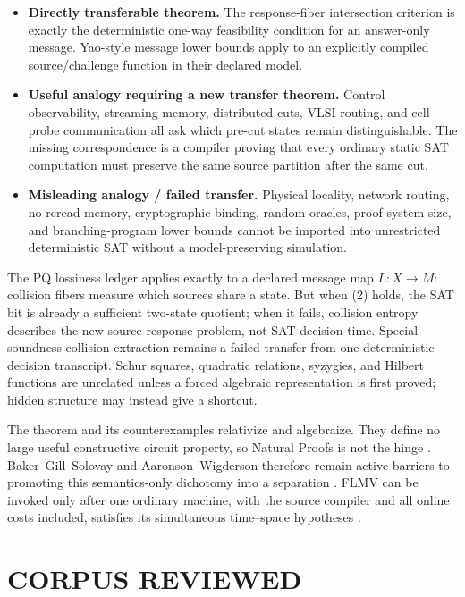 \documentclass[11pt]{article}
\begin{document}
\begin{itemize}[leftmargin=1.6em]
\item \textbf{Directly transferable theorem.}  The response-fiber
intersection criterion is exactly the deterministic one-way feasibility
condition for an answer-only message.  Yao-style message lower bounds apply
to an explicitly compiled source/challenge function in their declared model.
\item \textbf{Useful analogy requiring a new transfer theorem.}  Control
observability, streaming memory, distributed cuts, VLSI routing, and
cell-probe communication all ask which pre-cut states remain distinguishable.
The missing correspondence is a compiler proving that every ordinary static
SAT computation must preserve the same source partition after the same cut.
\item \textbf{Misleading analogy / failed transfer.}  Physical locality,
network routing, no-reread memory, cryptographic binding, random oracles,
proof-system size, and branching-program lower bounds cannot be imported into
unrestricted deterministic SAT without a model-preserving simulation.
\end{itemize}

The PQ lossiness ledger applies exactly to a declared message map
$L:X\to M$: collision fibers measure which sources share a state.  But when
(2) holds, the SAT bit is already a sufficient two-state quotient; when it
fails, collision entropy describes the new source-response problem, not SAT
decision time.  Special-soundness collision extraction remains a failed
transfer from one deterministic decision transcript.  Schur squares,
quadratic relations, syzygies, and Hilbert functions are unrelated unless a
forced algebraic representation is first proved; hidden structure may instead
give a shortcut.

The theorem and its counterexamples relativize and algebraize.  They define
no large useful constructive circuit property, so Natural Proofs is not the
hinge \cite{RR97}.  Baker--Gill--Solovay and Aaronson--Wigderson therefore
remain active barriers to promoting this semantics-only dichotomy into a
separation \cite{BGS75,AW09}.  FLMV can be invoked only after one ordinary
machine, with the source compiler and all online costs included, satisfies its
simultaneous time--space hypotheses \cite{FLMV05}.

\section{CORPUS REVIEWED}
\end{document}
